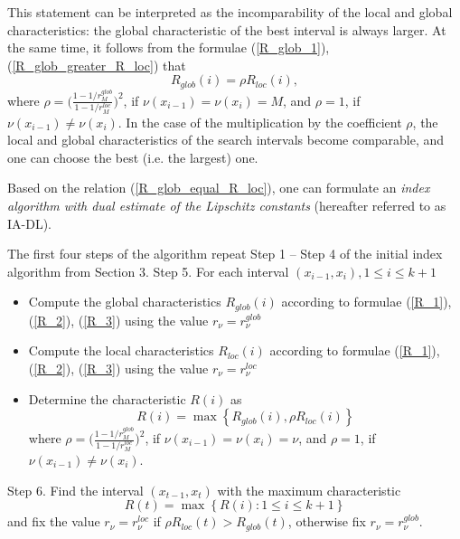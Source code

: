 \documentclass[review]{elsarticle}
\begin{document}
	This statement can be interpreted as the incomparability of the local and global characteristics: the global characteristic of the best interval is always larger. At the same time, it follows from the formulae (\ref{R_glob_1}), (\ref{R_glob_greater_R_loc}) that 
\begin{equation}\label{R_glob_equal_R_loc}
	R_{glob}(i) = \rho R_{loc}(i),
\end{equation}
where $\rho=\Big(\frac{1-1/r_{M}^{glob}}{1-1/r_{M}^{loc}}\Big)^2$, if $\nu(x_{i-1})=\nu(x_i)=M$, and $\rho=1$, if $\nu(x_{i-1}) \neq \nu(x_i)$. In the case of the multiplication by the coefficient $\rho$, the local and global characteristics of the search intervals become comparable, and one can choose the best (i.e. the largest) one.

	Based on the relation (\ref{R_glob_equal_R_loc}), one can formulate an \textit{index algorithm with dual estimate of the Lipschitz constants} (hereafter referred to as IA-DL).
	
	The first four steps of the algorithm repeat Step 1 -- Step 4 of the initial index algorithm from Section 3.
	Step 5. For each interval $(x_{i-1}, x_i), 1 \leq i \leq k+1$ 
\begin{flushleft}
	\begin{itemize}[]
		\item Compute the global characteristics $R_{glob}(i)$ according to formulae (\ref{R_1}), (\ref{R_2}), (\ref{R_3}) using the value $r_{\nu}=r_{\nu}^{glob}$
		\item Compute the local characteristics $R_{loc}(i)$ according to formulae (\ref{R_1}), (\ref{R_2}), (\ref{R_3}) using the value $r_{\nu}=r_{\nu}^{loc}$
		\item Determine the characteristic $R(i)$ as
\begin{equation}\label{R_max}
	R(i) = \max{\left\{ R_{glob}(i), \rho R_{loc}(i) \right\}}
\end{equation}
where $\rho=\Big(\frac{1-1/r_{M}^{glob}}{1-1/r_{M}^{loc}}\Big)^2$, if $\nu(x_{i-1})=\nu(x_i)=\nu$, and $\rho=1$, if $\nu(x_{i-1}) \neq \nu(x_i)$.
	\end{itemize}
\end{flushleft}

	Step 6. Find the interval $(x_{t-1}, x_t)$ with the maximum characteristic
\begin{equation}\label{R_max_t}
	R(t) = \max{\left\{ R(i): 1 \leq i \leq k+1\right\}}
\end{equation}
and fix the value $r_{\nu}=r_{\nu}^{loc}$ if $\rho R_{loc}(t) > R_{glob}(t)$, otherwise fix $r_{\nu}=r_{\nu}^{glob}$.
\end{document}
